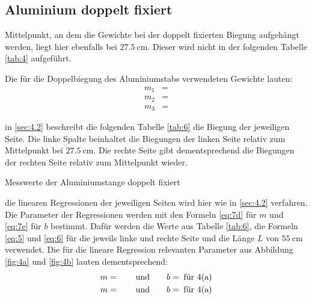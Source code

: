 \subsection{Aluminium doppelt fixiert}\label{4.4}

\justifying Mittelpunkt, an dem die Gewichte bei der doppelt fixierten Biegung aufgehängt werden, liegt hier ebenfalls bei 
$\SI{27.5}{\centi\meter}$. Dieser wird nicht in der folgenden Tabelle \ref{tab:4} aufgeführt.

Die für die Doppelbiegung des Aluminiumstabs verwendeten Gewichte lauten:
\begin{subequations}\label{eq:26}
\begin{align}
    m_1 &= \text{} \label{eq:26a}\\
    m_2 &= \text{} \label{eq:26b}\\
    m_3 &= \text{} \label{eq:26c}
\end{align}
\end{subequations}

\justifying in \ref{sec:4.2} beschreibt die folgenden Tabelle \ref{tab:6} die Biegung der jeweiligen Seite. Die linke Spalte
beinhaltet die Biegungen der linken Seite relativ zum Mittelpunkt bei $\SI{27.5}{\centi\meter}$. Die rechte Seite gibt dementsprechend die Biegungen
der rechten Seite relativ zum Mittelpunkt wieder. 
\begin{table}[H]
    \centering
    
    \caption{Messwerte der Aluminiumstange doppelt fixiert}
    \label{tab:6}
\end{table}

\justifying die linearen Regressionen der jeweiligen Seiten wird hier wie in \ref{sec:4.2} verfahren. Die Parameter der Regressionen
werden mit den Formeln \eqref{eq:7d} für $m$ und \eqref{eq:7e} für $b$ bestimmt. Dafür werden die Werte aus Tabelle \ref{tab:6}, die Formeln
\eqref{eq:5} und \eqref{eq:6} für die jeweils linke und rechte Seite und die Länge $L$ von $\SI{55}{\centi\meter}$ verwendet.
Die für die lineare Regression relevanten Parameter aus Abbildung \ref{fig:4a} und \ref{fig:4b} lauten dementsprechend:
\begin{subequations}\label{eq:27}
\begin{align}
    m = \text{} \qquad \text{und} \qquad
    b = \text{} \text{\;für 4(a)}\label{eq:27a}\\
    m = \text{} \qquad \text{und} \qquad
    b = \text{} \text{\;für 4(a)}\label{eq:27b}
\end{align}
\end{subequations}

